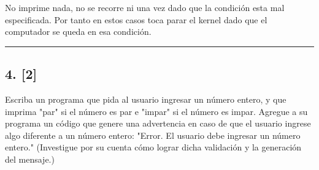 \documentclass[11pt]{article}
\begin{document}
No imprime nada, no se recorre ni una vez dado que la condición esta mal
especificada. Por tanto en estos casos toca parar el kernel dado que el
computador se queda en esa condición.

    \begin{center}\rule{0.5\linewidth}{\linethickness}\end{center}

    \subsection{4. {[}2{]}}\label{section}

Escriba un programa que pida al usuario ingresar un número entero, y que
imprima "par" si el número es par e "impar" si el número es impar.
Agregue a su programa un código que genere una advertencia en caso de
que el usuario ingrese algo diferente a un número entero: "Error. El
usuario debe ingresar un número entero." (Investigue por su cuenta cómo
lograr dicha validación y la generación del mensaje.)
\end{document}
